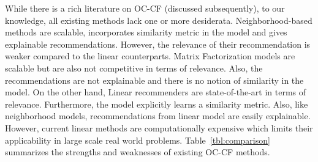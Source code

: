While there is a rich literature on OC-CF (discussed subsequently),
to our knowledge, all existing methods lack one
or more desiderata. 
Neighborhood-based methods are scalable, incorporates similarity metric in the model and gives explainable recommendations. 
However, the relevance of their recommendation is weaker compared to the linear counterparts. 
Matrix Factorization models are scalable but are also not competitive in terms of relevance. Also, the recommendations are not explainable and there is no notion of similarity in the model. On the other hand, Linear recommenders are state-of-the-art in terms of relevance. Furthermore, the model explicitly learns a similarity metric. Also, like neighborhood models, recommendations from linear model are easily explainable. However, current linear methods are computationally expensive which limits their applicability in large scale real world problems. Table~\ref{tbl:comparison} summarizes the strengths and weaknesses of existing OC-CF methods.

